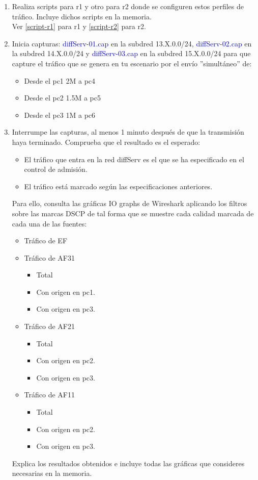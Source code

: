 \documentclass[12pt, a4paper]{report}
\begin{document}
\begin{enumerate}
	\item Realiza scripts para r1 y otro para r2 donde se configuren estos perfiles de tráfico. Incluye dichos
	scripts en la memoria.\\
	
	 Ver \ref{script-r1} para r1 y \ref{script-r2} para r2.
	\item Inicia capturas: \textcolor{blue}{diffServ-01.cap} en la subdred 13.X.0.0/24, \textcolor{blue}{diffServ-02.cap} en la subdred
	14.X.0.0/24 y \textcolor{blue}{diffServ-03.cap} en la subdred 15.X.0.0/24 para que capture el tráfico que se
	genera en tu escenario por el envío ”simultáneo” de:
	\begin{itemize}
		\item Desde el pc1 2M a pc4
		\item Desde el pc2 1.5M a pc5
		\item Desde el pc3 1M a pc6
	\end{itemize}
	\item Interrumpe las capturas, al menos 1 minuto después de que la transmisión haya terminado.
	Comprueba que el resultado es el esperado:
	\begin{itemize}
		\item El tráfico que entra en la red diffServ es el que se ha especificado en el control de admisión.
		\item El tráfico está marcado según las especificaciones anteriores.
	\end{itemize}
	Para ello, consulta las gráficas IO graphs de Wireshark aplicando los filtros sobre las marcas
	DSCP de tal forma que se muestre cada calidad marcada de cada una de las fuentes:
	\begin{itemize}
		\item Tráfico de EF
		\item Tráfico de AF31
		\begin{itemize}
			\item Total
			\item Con origen en pc1.
			\item Con origen en pc3.
		\end{itemize}
		\item Tráfico de AF21
		\begin{itemize}
			\item Total
			\item Con origen en pc2.
			\item Con origen en pc3.
		\end{itemize}
		\item Tráfico de AF11
		\begin{itemize}
			\item Total
			\item Con origen en pc2.
			\item Con origen en pc3.
		\end{itemize}
	\end{itemize}
	Explica los resultados obtenidos e incluye todas las gráficas que consideres necesarias en la
	memoria.\\
	

\end{enumerate}
\end{document}
